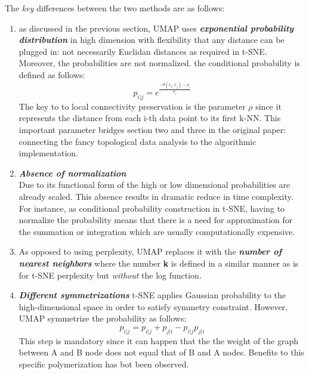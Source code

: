 \documentclass[a4paper, 11pt]{article}
\begin{document}
The  \textit{key} differences between the two methods are as follows:
\begin{enumerate}
\item as discussed in the previous section, UMAP uses \textit{\textbf{exponential probability distribution}} in high dimension with flexibility that any distance can be plugged in: not necessarily Euclidan distances as required in t-SNE.  Moreover, the probabilities are not normalized. the conditional probability is defined as follows:
$$
p_{i|j} = e^\frac{-d(x_i,x_j) -\rho_i}{\sigma_i} 
$$
The key to to local connectivity preservation is the parameter $\rho$ since it represents the distance from each i-th data point to its first k-NN. This important parameter bridges section two and three in the original paper: connecting the fancy topological data analysis to the algorithmic implementation. 
\item  \textit{\textbf{Absence of normalization}} \\
Due to its functional form of the high or low dimensional probabilities are already scaled. This absence results in dramatic reduce in time complexity. For instance, as conditional probability construction in  t-SNE, having to normalize the probability means that there is a need for approximation for the summation or integration which are usually computationally expensive.   
\item As opposed to using perplexity, UMAP replaces it with the \textit{\textbf{number of nearest neighbors}} where the number \textbf{k} is defined in a similar manner as is for t-SNE perplexity but \textit{without} the  log function.
 
 \item \textit{\textbf{Different symmetrizations} }
 t-SNE applies Gaussian probability to the high-dimensional space in order to satisfy  symmetry constraint. However, UMAP symmetrize the probability as follows: 
 $$
 p_{i|j} =  p_{i|j} +  p_{j|i} -  p_{i|j} p_{j|i}
 $$
 This step is mandatory since it can happen that the the weight of the graph between A and B node does not equal that of B and A nodes.  Benefits to this specific polymerization has bot been observed. 


\end{enumerate}
\end{document}
